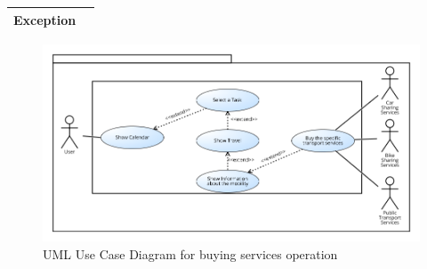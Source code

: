 \begin{table}[H]
\begin{tabular}{|p{3.5cm}|p{10.3cm}|}
    \hline
    \textbf{\large{Exception}} 			& \\
    
    \hline
    
    
    \end{tabular}
	
\end{table}

\begin{figure}[H]
\centering
\includegraphics[scale=0.5]{Pictures/UseCaseDiagram/Buy_services.png}
\caption{UML Use Case Diagram for buying services operation}
\end{figure}
